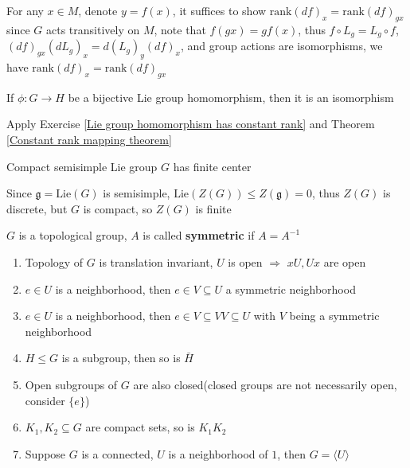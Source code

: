 \documentclass[main]{subfiles}
\begin{document}
\begin{solution}
For any $x\in M$, denote $y=f(x)$, it suffices to show $\mathrm{rank}(df)_x=\mathrm{rank}(df)_{gx}$ since $G$ acts transitively on $M$, note that $f(gx)=gf(x)$, thus $f\circ L_g=L_{g}\circ f$, $(df)_{gx}(dL_g)_x=d(L_g)_y(df)_x$, and group actions are isomorphisms, we have $\mathrm{rank}(df)_x=\mathrm{rank}(df)_{gx}$
\end{solution}

\begin{exercise}
If $\phi:G\to H$ be a bijective Lie group homomorphism, then it is an isomorphism
\end{exercise}

\begin{solution}
 Apply Exercise \ref{Lie group homomorphism has constant rank} and Theorem \ref{Constant rank mapping theorem}
\end{solution}

\begin{exercise}
Compact semisimple Lie group $G$ has finite center
\end{exercise}

\begin{solution}
Since $\mathfrak g=\mathrm{Lie}(G)$ is semisimple, $\mathrm{Lie}(Z(G))\leq Z(\mathfrak g)=0$, thus $Z(G)$ is discrete, but $G$ is compact, so $Z(G)$ is finite
\end{solution}

\begin{exercise}\label{rudimentary facts about topological groups}
$G$ is a topological group, $A$ is called \textbf{symmetric} if $A=A^{-1}$
\begin{enumerate}[{label=\textbf{\arabic*.}}, leftmargin=*]
\item Topology of $G$ is translation invariant, $U$ is open $\Rightarrow$ $xU,Ux$ are open
\item $e\in U$ is a neighborhood, then $e\in V\subseteq U$ a symmetric neighborhood
\item $e\in U$ is a neighborhood, then $e\in V\subseteq VV\subseteq U$ with $V$ being a symmetric neighborhood
\item $H\leq G$ is a subgroup, then so is $\bar{H}$
\item Open subgroups of $G$ are also closed(closed groups are not necessarily open, consider $\{e\}$)
\item $K_1,K_2\subseteq G$ are compact sets, so is $K_1K_2$
\item Suppose $G$ is a connected, $U$ is a neighborhood of $1$, then $G=\langle U\rangle$
\end{enumerate}
\end{exercise}
\end{document}
